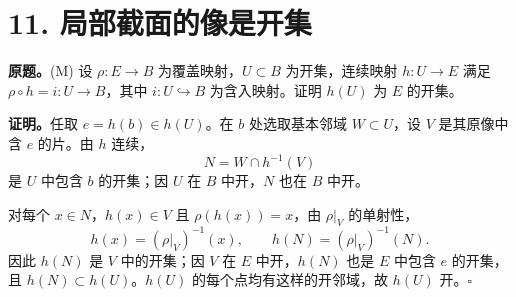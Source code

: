 \documentclass[UTF8,11pt,a4paper]{ctexart}
\newcommand{\pf}{\par\noindent\textbf{证明。}}
\begin{document}
\section*{11. 局部截面的像是开集}
\textbf{原题。}(M) 设 $\rho:E\to B$ 为覆盖映射，$U\subset B$ 为开集，连续映射 $h:U\to E$ 满足 $\rho\circ h=i:U\to B$，其中 $i:U\hookrightarrow B$ 为含入映射。证明 $h(U)$ 为 $E$ 的开集。
\pf 任取 $e=h(b)\in h(U)$。在 $b$ 处选取基本邻域 $W\subset U$，设 $V$ 是其原像中含 $e$ 的片。由 $h$ 连续，
\[N=W\cap h^{-1}(V)\]
是 $U$ 中包含 $b$ 的开集；因 $U$ 在 $B$ 中开，$N$ 也在 $B$ 中开。

对每个 $x\in N$，$h(x)\in V$ 且 $\rho(h(x))=x$，由 $\rho|_V$ 的单射性，
\[h(x)=(\rho|_V)^{-1}(x),\qquad
h(N)=(\rho|_V)^{-1}(N).\]
因此 $h(N)$ 是 $V$ 中的开集；因 $V$ 在 $E$ 中开，$h(N)$ 也是 $E$ 中包含 $e$ 的开集，且 $h(N)\subset h(U)$。$h(U)$ 的每个点均有这样的开邻域，故 $h(U)$ 开。\hfill$\square$
\end{document}
